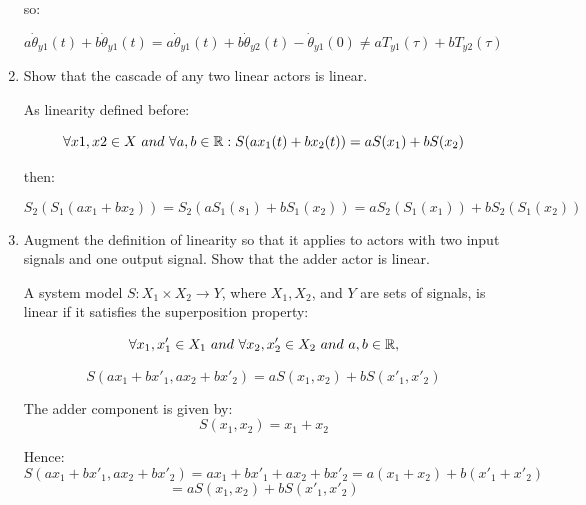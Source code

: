 \documentclass[12pt]{article}
\begin{document}
\begin{enumerate}
\begin{qsolve}[Solution]
	\end{qsolve}
	
	\begin{qsolve}[Solution]
		so:
		
		$$ a\dot{\theta}_{y1}(t)+b\dot{\theta}_{y1}(t) = a\dot{\theta}_{y1}(t)+b\dot{\theta}_{y2}(t)-\dot{\theta}_{y1}(0) \neq aT_{y1}(\tau)+bT_{y2}(\tau) $$
	\end{qsolve}
	
	
			
	
	\item Show that the cascade of any two linear actors is linear.
	
	
	\begin{qsolve}[Solution]
		As linearity defined before:
		
		$$ \forall x1, x2 \in X \\\ and \\\ \forall a, b \in \mathbb{R}: S(ax_1(t) + bx_2(t))=aS(x_1)+bS(x_2) $$
		
		then:
		
		$$ S_2(S_1(ax_1+bx_2)) = S_2(aS_1(s_1)+bS_1(x_2)) = aS_2(S_1(x_1))+bS_2(S_1(x_2))$$
	\end{qsolve}
	
	
	
	
	
	
	\item Augment the definition of linearity so that it applies to actors with two input
	signals and one output signal. Show that the adder actor is linear.
	
	\begin{qsolve}[Solution]
		A system model $S:X_1 \times X_2 \rightarrow Y$, where $X_1, X_2$, and $Y$ are sets of signals, is linear if it satisfies the superposition property:
		
		$$ \forall x_1, x'_1 \in X_1 \\\ and \\\ \forall  x_2, x'_2 \in X_2 \\\ and \\\ a,b \in \mathbb{R},$$
		
		$$ S(ax_1+bx'_1, ax_2+bx'_2)=aS(x_1,x_2)+bS(x'_1,x'_2) $$
		
		The adder component is given by:
		$$ S(x_1, x_2)=x_1+x_2 $$
		
		Hence:
		$$ S(ax_1+bx'_1, ax_2+bx'_2)=ax_1+bx'_1+ax_2+bx'_2=a(x_1+x_2)+b(x'_1+x'_2)$$
		$$ =aS(x_1,x_2)+bS(x'_1,x'_2) $$
		
	\end{qsolve}
\end{enumerate}
\end{document}
